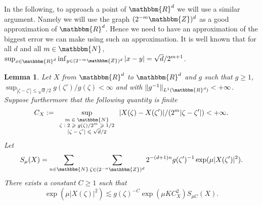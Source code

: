 \documentclass[a4paper,11pt]{article}
\newcommand{\assign}{:=}
\newcommand{\tmscript}[1]{\text{\scriptsize{$#1$}}}
\newtheorem{lemma}[theorem]{Lemma}
\begin{document}
In the following, to approach a point of $\mathbbm{R}^{d}$ we will use a
similar argument. Namely we will use the graph $( 2^{-m} \mathbbm{Z} )^{d}$ as
a good approximation of $\mathbbm{R}^{d}$. Hence we need to have an
approximation of the biggest error we can make using such an approximation. It
is well known that for all $d$ and all $m \in \mathbbm{N}$, $\sup_{x \in
\mathbbm{R}^{d}} \inf_{y \in ( 2^{-m} \mathbbm{Z} )^{d}} | x-y | = \sqrt{d}
/2^{m+1}$.

\begin{lemma}
  \label{lemma_chaining_space}Let $X$ from $\mathbbm{R}^{d}$ to
  $\mathbbm{R}^{d}$ and $g$ such that $g \geqslant 1$, $\sup_{| \zeta - \zeta'
  | \leqslant \sqrt{d} /2} g ( \zeta' ) /g ( \zeta ) < \infty$ and with $\|
  g^{-1} \|_{L^{1} ( \mathbbm{R}^{d} )} <+ \infty$. Suppose furthermore that
  the following quantity is finite
  \[ C_{X} \assign \sup_{\tmscript{\begin{array}{c}
       m \in \mathbbm{N}\\
       \zeta : 2 \geqslant g ( \zeta ) /2^{m} \geqslant 1/2\\
       | \zeta - \zeta' | \leqslant \sqrt{d} /2
     \end{array}}} | X ( \zeta ) -X ( \zeta' ) | / ( 2^{m} | \zeta - \zeta' |
     ) <+ \infty . \]
  Let
  \[ S_{\mu} ( X ) = \sum_{n \in \mathbbm{N}} \sum_{\zeta \in ( 2^{-n}
     \mathbbm{Z} )^{d}} 2^{- ( d+1 ) n} g ( \zeta' )^{-1} \exp ( \mu | X (
     \zeta' ) |^{2} ) . \]
  There exists a constant $C \geqslant 1$ such that
  \[ \exp ( \mu | X ( \zeta ) |^{2} ) \lesssim g ( \zeta )^{-C} \exp ( \mu K
     C_{X}^{2} ) S_{\mu C} ( X ) . \]
\end{lemma}
\end{document}
